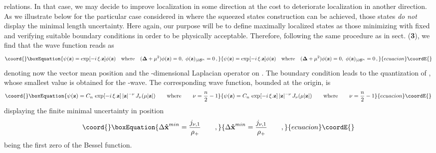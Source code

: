 \documentclass[a4paper,10pt]{article}
\providecommand{\x}{\mbox{\rm{\bf \^ x}}}
\providecommand{\p}{\mbox{\rm{\bf \^ p}}}
\providecommand{\cB}{{\cal B}}
\begin{document}
relations. In that case, we may decide to improve localization in
some direction at the cost to deteriorate localization in another
direction. As we illustrate below for the particular case \myHighlight{$g(\p
^2) =1$}\coordHE{} considered in \cite{KeMa} where the squeezed states
construction can be achieved, those states {\it do not} display
the minimal length uncertainty. Here again, our purpose will be to
define maximally localized states as those minimizing \myHighlight{$(\Delta
\x)^2$}\coordHE{} with \myHighlight{$\langle \x \rangle = {\xi}$}\coordHE{} fixed and verifying
suitable boundary conditions in order to be physically acceptable.
Therefore, following the same procedure as in sect. ({\bf 3}), we
find that the wave function reads as
\begin{equation}\coord{}\boxEquation{
\psi ({\bf z}) = \exp[-i \, {\xi}.{\bf z}] \phi ({\bf z}) \quad
\mbox{where} \quad ({\bf \Delta} + \mu ^2)\phi ({\bf z}) = 0, \,\,
\phi ({\bf z})_{\vert \partial \cB^n} =0 \, ,
}{
\psi ({\bf z}) = \exp[-i \, {\xi}.{\bf z}] \phi ({\bf z}) \quad
\mbox{where} \quad ({\bf \Delta} + \mu ^2)\phi ({\bf z}) = 0, \,\,
\phi ({\bf z})_{\vert \partial \cB^n} =0 \, ,
}{ecuacion}\coordE{}\end{equation}
\myHighlight{$\xi$}\coordHE{} denoting now the vector mean position and \myHighlight{${\bf \Delta}$}\coordHE{} the
\coordHE{}-dimensional Laplacian operator on \myHighlight{$\cB^n$}\coordHE{}. The boundary
condition \coordHE{} leads to the
quantization of \coordHE{}, whose smallest value is obtained for the
\coordHE{}-wave. The corresponding wave function, bounded at the origin,
is
\begin{equation}\coord{}\boxEquation{
\psi ({\bf z}) = C_n \,\exp[-i\,\xi. {\bf z}] \,\vert{\bf
z}\vert^{-\nu}\, J_{\nu} (\mu |{\bf z}|)\qquad {\rm where}\qquad
\nu=\frac n2 - 1
}{
\psi ({\bf z}) = C_n \,\exp[-i\,\xi. {\bf z}] \,\vert{\bf
z}\vert^{-\nu}\, J_{\nu} (\mu |{\bf z}|)\qquad {\rm where}\qquad
\nu=\frac n2 - 1
}{ecuacion}\coordE{}\end{equation}
displaying the finite minimal uncertainty in position
\begin{equation}\coord{}\boxEquation{
\Delta \x^{min} = \frac{j_{\nu,1}}{\rho_+} \qquad, \label{xmin}
}{
\Delta \x^{min} = \frac{j_{\nu,1}}{\rho_+} \qquad, }{ecuacion}\coordE{}\end{equation}
\coordHE{} being the first zero of the \coordHE{} Bessel
function.
\end{document}

